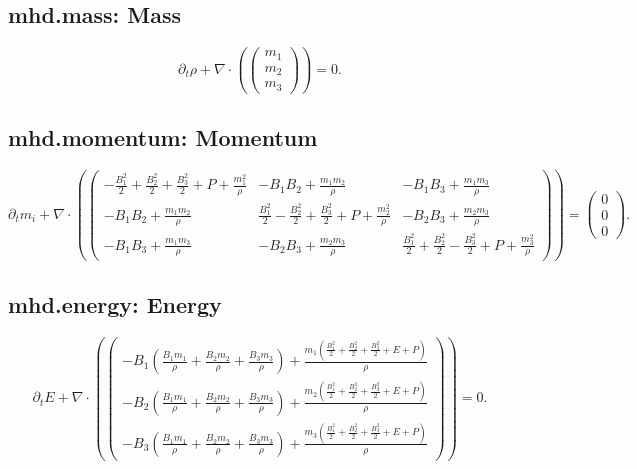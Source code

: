\documentclass[11pt]{article}
\begin{document}
\subsection*{mhd.mass: Mass}
\[
\partial_t \rho + \nabla\cdot\left(\begin{pmatrix}m_{1} \\ m_{2} \\ m_{3}\end{pmatrix}\right) = 0.
\]
\subsection*{mhd.momentum: Momentum}
\[
\partial_t m_i + \nabla\cdot\left(\begin{pmatrix}- \frac{B_{1}^{2}}{2} + \frac{B_{2}^{2}}{2} + \frac{B_{3}^{2}}{2} + P + \frac{m_{1}^{2}}{\rho} & - B_{1} B_{2} + \frac{m_{1} m_{2}}{\rho} & - B_{1} B_{3} + \frac{m_{1} m_{3}}{\rho} \\ - B_{1} B_{2} + \frac{m_{1} m_{2}}{\rho} & \frac{B_{1}^{2}}{2} - \frac{B_{2}^{2}}{2} + \frac{B_{3}^{2}}{2} + P + \frac{m_{2}^{2}}{\rho} & - B_{2} B_{3} + \frac{m_{2} m_{3}}{\rho} \\ - B_{1} B_{3} + \frac{m_{1} m_{3}}{\rho} & - B_{2} B_{3} + \frac{m_{2} m_{3}}{\rho} & \frac{B_{1}^{2}}{2} + \frac{B_{2}^{2}}{2} - \frac{B_{3}^{2}}{2} + P + \frac{m_{3}^{2}}{\rho}\end{pmatrix}\right) = \begin{pmatrix}0 \\ 0 \\ 0\end{pmatrix}.
\]
\subsection*{mhd.energy: Energy}
\[
\partial_t E + \nabla\cdot\left(\begin{pmatrix}- B_{1} \left(\frac{B_{1} m_{1}}{\rho} + \frac{B_{2} m_{2}}{\rho} + \frac{B_{3} m_{3}}{\rho}\right) + \frac{m_{1} \left(\frac{B_{1}^{2}}{2} + \frac{B_{2}^{2}}{2} + \frac{B_{3}^{2}}{2} + E + P\right)}{\rho} \\ - B_{2} \left(\frac{B_{1} m_{1}}{\rho} + \frac{B_{2} m_{2}}{\rho} + \frac{B_{3} m_{3}}{\rho}\right) + \frac{m_{2} \left(\frac{B_{1}^{2}}{2} + \frac{B_{2}^{2}}{2} + \frac{B_{3}^{2}}{2} + E + P\right)}{\rho} \\ - B_{3} \left(\frac{B_{1} m_{1}}{\rho} + \frac{B_{2} m_{2}}{\rho} + \frac{B_{3} m_{3}}{\rho}\right) + \frac{m_{3} \left(\frac{B_{1}^{2}}{2} + \frac{B_{2}^{2}}{2} + \frac{B_{3}^{2}}{2} + E + P\right)}{\rho}\end{pmatrix}\right) = 0.
\]
\end{document}

